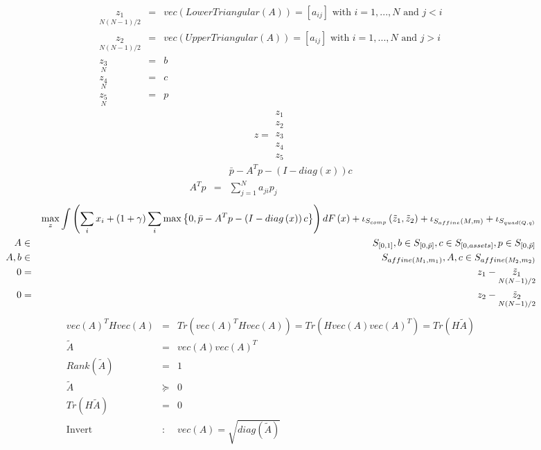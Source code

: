 \documentclass{article}
\begin{document}
\begin{eqnarray*}
\underset{N\left( N-1\right) /2}{z_{1}} &=&vec\left( LowerTriangular\left(
A\right) \right) =\left[ a_{ij}\right] \text{ with }i=1,...,N\text{ and }j<i
\\
\underset{N\left( N-1\right) /2}{z_{2}} &=&vec\left( UpperTriangular\left(
A\right) \right) =\left[ a_{ij}\right] \text{ with }i=1,...,N\text{ and }j>i
\\
\underset{N}{z_{3}} &=&b \\
\underset{N}{z_{4}} &=&c \\
\underset{N}{z_{5}} &=&p
\end{eqnarray*}%
\begin{equation*}
z=%
\begin{array}{c}
z_{1} \\ 
z_{2} \\ 
z_{3} \\ 
z_{4} \\ 
z_{5}%
\end{array}%
\end{equation*}%
\begin{eqnarray*}
&&\bar{p}-A^{T}p-\left( I-diag\left( x\right) \right) c \\
A^{T}p &=&\sum_{j=1}^{N}a_{ji}p_{j}
\end{eqnarray*}%
\begin{eqnarray*}
&&\max_{z}\int \left( \sum_{i}x_{i}+\left( 1+\gamma \right) \sum_{i}\max
\left\{ 0,\bar{p}-A^{T}p-\left( I-diag\left( x\right) \right) c\right\}
\right) dF\left( x\right) +\iota _{S_{comp}}\left( \tilde{z}_{1},\tilde{z}%
_{2}\right) +\iota _{S_{affine}\left( M,m\right) }+\iota _{S_{quad\left(
Q,q\right) }} \\
A &\in &S_{\left[ 0,1\right] },b\in S_{\left[ 0,\bar{p}\right] },c\in S_{%
\left[ 0,assets\right] },p\in S_{\left[ 0,\bar{p}\right] } \\
A,b &\in &S_{affine\left( M_{1},m_{1}\right) },A,c\in S_{affine\left(
M_{2},m_{2}\right) } \\
0 &=&z_{1}-\underset{N\left( N-1\right) /2}{\tilde{z}_{1}} \\
0 &=&z_{2}-\underset{N\left( N-1\right) /2}{\tilde{z}_{2}}
\end{eqnarray*}%
\begin{eqnarray*}
vec\left( A\right) ^{T}Hvec\left( A\right) &=&Tr\left( vec\left( A\right)
^{T}Hvec\left( A\right) \right) =Tr\left( Hvec\left( A\right) vec\left(
A\right) ^{T}\right) =Tr\left( H\tilde{A}\right) \\
\tilde{A} &=&vec\left( A\right) vec\left( A\right) ^{T} \\
Rank\left( \tilde{A}\right) &=&1 \\
\tilde{A} &\succeq &0 \\
Tr\left( H\tilde{A}\right) &=&0 \\
\text{Invert} &\text{:}&vec\left( A\right) =\sqrt{diag\left( \tilde{A}%
\right) }
\end{eqnarray*}%
\end{document}
